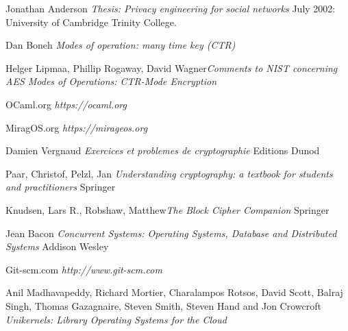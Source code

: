 \documentclass[10pt,a4paper]{report}
\begin{document}
  \begin{thebibliography}{1}

   Jonathan Anderson {\em Thesis: Privacy engineering for social networks} July 2002: University of Cambridge Trinity College.

   Dan Boneh {\em Modes of operation: many time key (CTR)} 
  
    Helger Lipmaa, Phillip Rogaway, David Wagner{\em Comments to NIST concerning AES Modes of Operations: CTR-Mode Encryption} 

   OCaml.org {\em https://ocaml.org} 
  
   MiragOS.org {\em https://mirageos.org} 
  
   Damien Vergnaud {\em Exercices et problemes de cryptographie} Editions Dunod

    Paar, Christof, Pelzl, Jan {\em Understanding cryptography: a textbook for students and practitioners} Springer

   Knudsen, Lars R., Robshaw, Matthew{\em The Block Cipher Companion} Springer

   Jean Bacon {\em Concurrent Systems: Operating Systems, Database and Distributed Systems} Addison Wesley

   Git-scm.com {\em http://www.git-scm.com}
 
  Anil Madhavapeddy, Richard Mortier, Charalampos Rotsos, David Scott, Balraj Singh, Thomas Gazagnaire, Steven Smith, Steven Hand and Jon Crowcroft {\em Unikernels: Library Operating Systems for the Cloud}



  \end{thebibliography}
\end{document}
